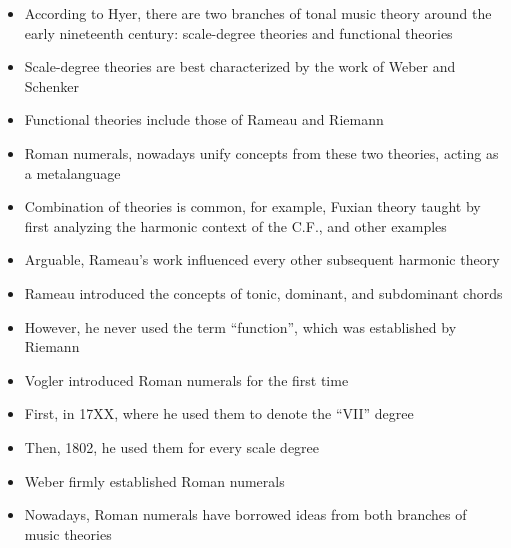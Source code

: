 \begin{itemize} \item According to Hyer, there are two
    branches of tonal music theory around the early
    nineteenth century: scale-degree theories and
    functional theories \item Scale-degree theories are
    best characterized by the work of Weber and Schenker
    \item Functional theories include those of Rameau and
    Riemann \item Roman numerals, nowadays unify concepts
    from these two theories, acting as a metalanguage
    \item Combination of theories is common, for example,
    Fuxian theory taught by first analyzing the harmonic
    context of the C.F., and other examples \item
    Arguable, Rameau's work influenced every other
    subsequent harmonic theory \item Rameau introduced the
    concepts of tonic, dominant, and subdominant chords
    \item However, he never used the term ``function'',
    which was established by Riemann \item Vogler
    introduced Roman numerals for the first time \item
    First, in 17XX, where he used them to denote the
    ``VII'' degree \item Then, 1802, he used them for
    every scale degree \item Weber firmly established
    Roman numerals \item Nowadays, Roman numerals have
    borrowed ideas from both branches of music theories
    \end{itemize}
